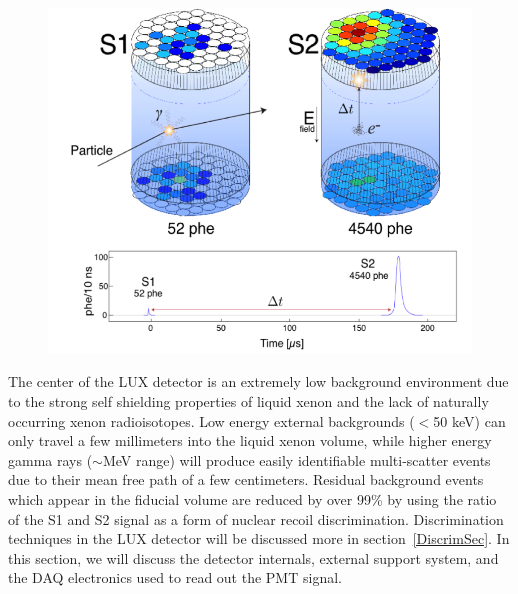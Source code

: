  \begin{figure} 
\includegraphics[scale=.5]{LUXevent.png} 
\label{LUXevent}
\end{figure}

The center of the LUX detector is an extremely low background environment due to the strong self shielding properties of liquid xenon and the lack of naturally occurring xenon radioisotopes.  Low energy external backgrounds ($<$50 keV) can only travel a few millimeters into the liquid xenon volume, while higher energy gamma rays ($\sim$MeV range) will produce easily identifiable multi-scatter events due to their mean free path of a few centimeters.  Residual background events which appear in the fiducial volume are reduced by over 99\% by using the ratio of the S1 and S2 signal as a form of nuclear recoil discrimination.  Discrimination techniques in the LUX detector will be discussed more in section~\ref{DiscrimSec}.  In this section, we will  discuss the detector internals, external support system, and the DAQ electronics used to read out the PMT signal.  

